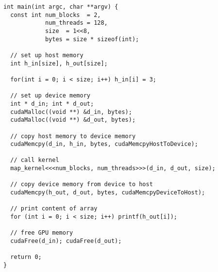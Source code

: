 \begin{lstlisting}[caption={Calling a kernel}, label={lst:kernel call example}]
int main(int argc, char **argv) {
  const int num_blocks  = 2, 
            num_threads = 128, 
            size  = 1<<8,
            bytes = size * sizeof(int);

  // set up host memory
  int h_in[size], h_out[size];

  for(int i = 0; i < size; i++) h_in[i] = 3;

  // set up device memory
  int * d_in; int * d_out;
  cudaMalloc((void **) &d_in, bytes);
  cudaMalloc((void **) &d_out, bytes);

  // copy host memory to device memory
  cudaMemcpy(d_in, h_in, bytes, cudaMemcpyHostToDevice);

  // call kernel
  map_kernel<<<num_blocks, num_threads>>>(d_in, d_out, size);

  // copy device memory from device to host
  cudaMemcpy(h_out, d_out, bytes, cudaMemcpyDeviceToHost);

  // print content of array
  for (int i = 0; i < size; i++) printf(h_out[i]);

  // free GPU memory
  cudaFree(d_in); cudaFree(d_out);

  return 0;
}
\end{lstlisting}


